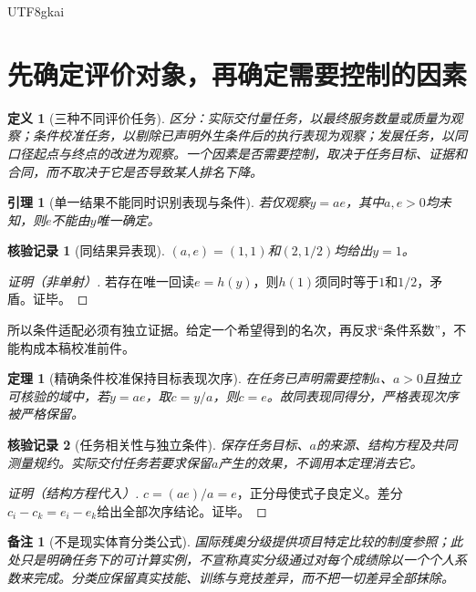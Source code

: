 \documentclass[12pt,a4paper,openany]{report}
\newtheorem{definition}{定义}[chapter]
\newtheorem{theorem}{定理}[chapter]
\newtheorem{lemma}{引理}[chapter]
\newtheorem{remark}{备注}[chapter]
\newtheorem{Certificate}{核验记录}[chapter]
\begin{document}
\begin{CJK*}{UTF8}{gkai}
\section{先确定评价对象，再确定需要控制的因素}
\begin{definition}[三种不同评价任务]
\label{def:target}
区分：实际交付量任务，以最终服务数量或质量为观察；条件校准任务，以剔除已声明外生条件后的执行表现为观察；发展任务，以同口径起点与终点的改进为观察。一个因素是否需要控制，取决于任务目标、证据和合同，而不取决于它是否导致某人排名下降。
\end{definition}
\begin{lemma}[单一结果不能同时识别表现与条件]
\label{lem:identification}
若仅观察$y=ae$，其中$a,e>0$均未知，则$e$不能由$y$唯一确定。
\end{lemma}
\begin{Certificate}[同结果异表现]
$(a,e)=(1,1)$和$(2,1/2)$均给出$y=1$。
\end{Certificate}
\begin{proof}[证明（非单射）]
若存在唯一回读$e=h(y)$，则$h(1)$须同时等于$1$和$1/2$，矛盾。证毕。
\end{proof}
所以条件适配必须有独立证据。给定一个希望得到的名次，再反求“条件系数”，不能构成本稿校准前件。

\begin{theorem}[精确条件校准保持目标表现次序]
\label{thm:calibration}
在任务已声明需要控制$a$、$a>0$且独立可核验的域中，若$y=ae$，取$c=y/a$，则$c=e$。故同表现同得分，严格表现次序被严格保留。
\end{theorem}
\begin{Certificate}[任务相关性与独立条件]
保存任务目标、$a$的来源、结构方程及共同测量规约。实际交付任务若要求保留$a$产生的效果，不调用本定理消去它。
\end{Certificate}
\begin{proof}[证明（结构方程代入）]
$c=(ae)/a=e$，正分母使式子良定义。差分$c_i-c_k=e_i-e_k$给出全部次序结论。证毕。
\end{proof}
\begin{remark}[不是现实体育分类公式]
国际残奥分级提供项目特定比较的制度参照\cite{IPCClassification}；此处只是明确任务下的可计算实例，不宣称真实分级通过对每个成绩除以一个个人系数来完成。分类应保留真实技能、训练与竞技差异，而不把一切差异全部抹除。
\end{remark}


\end{CJK*}
\end{document}
